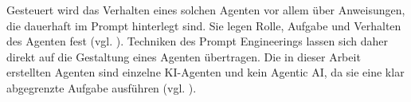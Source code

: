 Gesteuert wird das Verhalten eines solchen Agenten vor allem über Anweisungen, die dauerhaft im Prompt hinterlegt sind. Sie legen Rolle, Aufgabe und Verhalten des Agenten fest (vgl. \cite[S. 6]{wang2024survey}). Techniken des Prompt Engineerings lassen sich daher direkt auf die Gestaltung eines Agenten übertragen. Die in dieser Arbeit erstellten Agenten sind einzelne \ac{KI}-Agenten und kein Agentic AI, da sie eine klar abgegrenzte Aufgabe ausführen (vgl. \cite[S. 1 ff.]{sapkota2026agenticai}).

